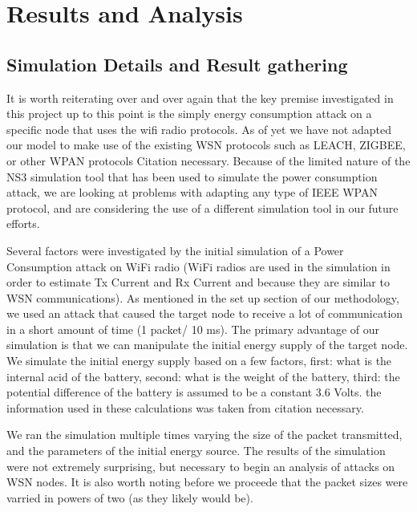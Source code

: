 \section{Results and Analysis}

\subsection{Simulation Details and Result gathering}
It is worth reiterating over and over again that the key premise investigated in this project up to this point is the simply 
energy consumption attack on a specific node that uses the wifi radio protocols. As of yet we have not adapted our model to 
make use of the existing WSN protocols such as LEACH, ZIGBEE, or other WPAN protocols {Citation necessary}. Because of the 
limited nature of the NS3 simulation tool that has been used to simulate the power consumption attack, we are looking at 
problems with adapting any type of IEEE WPAN protocol, and are considering the use of a different simulation tool in our future efforts. 


Several factors were investigated by the initial simulation of a Power Consumption attack on WiFi radio 
(WiFi radios are used in the simulation in order to estimate Tx Current and Rx Current and because they are similar to WSN communications).
 As mentioned in the set up section of our methodology, we used an attack that caused the target node to receive a lot of communication 
in a short amount of time (1 packet/ 10 ms). The primary advantage of our simulation is that we can manipulate the initial energy 
supply of the target node. We simulate the initial energy supply based on a few factors, first: what is the internal acid of the 
battery, second: what is the weight of the battery, third: the potential difference of the battery is assumed to be a constant 3.6 Volts. 
the information used in these calculations was taken from {citation necessary}.

We ran the simulation multiple times varying the size of the packet transmitted, and the parameters of the initial energy source. The 
results of the simulation were not extremely surprising, but necessary to begin an analysis of attacks on WSN nodes. It is also worth
noting before we proceede that the packet sizes were varried in powers of two (as they likely would be). 

